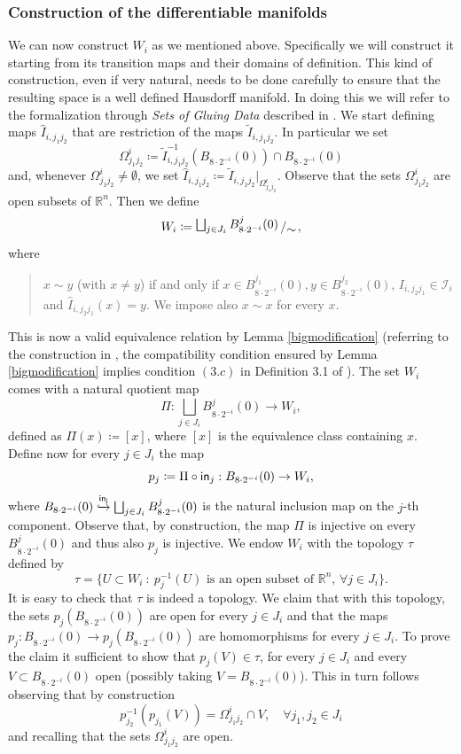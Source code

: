 \documentclass[11pt]{article}
\newcommand{\rr}{\mathbb{R}}
\newcommand{\bigslant}[2]{{\raisebox{.2em}{$#1$}\left/\raisebox{-.2em}{$#2$}\right.}}
\theoremstyle{plain}
\theoremstyle{definition}
\numberwithin{equation}{section}
\begin{document}
\subsubsection{Construction of the differentiable manifolds}\label{sec:build manifold}
We can now construct $W_i$ as we mentioned above. Specifically we will construct it starting from its transition maps and their domains of definition. This kind of construction, even if very natural, needs to be done carefully to ensure that the resulting space is a well defined Hausdorff manifold. In doing this we will refer to the formalization through  \emph{Sets of Gluing Data} described in \cite[Thereom 3.1]{glue}.  We start defining maps $\hat I_{i,j_1j_2}$ that are restriction of the maps $\widetilde I_{i,j_1j_2}$. In particular we set
\begin{equation}\label{eq:def omega charts}
\Omega^i_{j_1j_2}\coloneqq \widetilde I_{i,j_1j_2}^{-1}(B_{8\cdot 2^{-i}}(0))\cap B_{8\cdot 2^{-i}}(0)  \end{equation}
and, whenever $\Omega^i_{j_1j_2}\neq \emptyset$, we set  $\hat I_{i,j_1j_2}\coloneqq \widetilde I_{i,j_1j_2}|_{\Omega^i_{j_1j_2}}$. Observe that the sets $\Omega^i_{j_1j_2}$ are open subsets of $\rr^n.$ Then we define
\[ W_i\coloneqq  \bigslant{\bigsqcup_{j \in J_i} B^j_{8\cdot 2^{-i}}(0) }{\sim},	 \]
where  
\begin{quote}
    $x \sim y$ (with $x \neq y$) if and only if $x \in B^{j_1}_{8\cdot 2^{-i}}(0), y \in B^{j_2}_{8\cdot 2^{-i}}(0) $, $I_{i,j_2j_1}\in \mathcal I_i$  and $\hat I_{i,j_2j_1}(x)=y$. We impose also $x \sim x$ for every $x$.
\end{quote}
 This is now a valid equivalence relation by Lemma \ref{bigmodification} (referring to the construction in \cite{glue}, the compatibility condition ensured by Lemma \ref{bigmodification} implies condition $(3.c)$ in Definition 3.1 of \cite{glue}). The set $W_i$ comes with a natural quotient map
\[ \Pi: \bigsqcup_{j \in J_i} B^j_{8\cdot 2^{-i}}(0)  \to W_i, \]
defined as $\Pi(x)\coloneqq [x]$, where $[x]$ is the equivalence class containing $x$. Define now for every $j \in J_i$ the map 
\[p_{j}\coloneqq \Pi \circ 	{\sf{in}}_j : B_{8\cdot 2^{-i}}(0) \to W_i,\]
where $B_{8\cdot 2^{-i}}(0) \overset{\sf{in}_j}{\xhookrightarrow{}}  \bigsqcup_{j \in J_i} B^j_{8\cdot 2^{-i}}(0) $ is the natural inclusion map on the $j$-th component.
Observe that, by construction, the map $\Pi$ is injective on every $B^{j}_{8\cdot 2^{-i}}(0)$ and thus also $p_{j}$ is injective. We endow $W_i$ with the topology $\tau$ defined by
\[\tau=\{U\subset W_i \ : \ p_j^{-1}(U) \text{ is an open subset of } \rr^n,\, \forall j \in J_i\}.\]
It is easy to check that $\tau$ is indeed a topology. We claim that with this topology, the sets $p_j(B_{8\cdot 2^{-i}}(0))$ are open for every $j \in J_i$ and that the maps $p_j: B_{8\cdot 2^{-i}}(0)\to p_j(B_{8\cdot 2^{-i}}(0))$ are homomorphisms for every $j \in J_i.$ To prove the claim it sufficient to show that  $p_j(V)\in \tau$, for every $j \in J_i$ and every $V\subset B_{8\cdot 2^{-i}}(0)$ open (possibly taking $V=B_{8\cdot 2^{-i}}(0)$). This in turn follows observing that by construction
\[
p_{j_2}^{-1}(p_{j_1}(V))=\Omega^i_{j_1j_2}\cap V, \quad \forall j_1,j_2 \in J_i
\]
and recalling that the sets $\Omega^i_{j_1j_2}$ are open.  
\end{document}
